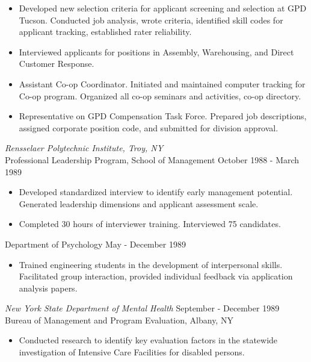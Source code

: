 \documentclass{/Users/alexemrie/Documents/LaTeX/res/res}
\begin{document}
\begin{resume}
   \begin{itemize} \itemsep -2pt %
   \item Developed  new selection criteria for applicant screening and 
    selection  at  GPD  Tucson.  Conducted  job  analysis,  wrote 
    criteria,  identified  skill  codes  for  applicant tracking, 
    established rater reliability. 
   \item Interviewed   applicants   for   positions    in    Assembly, 
    Warehousing, and Direct Customer Response. 
  \item Assistant   Co-op   Coordinator.   Initiated  and  maintained 
    computer tracking for  Co-op  program.  Organized  all  co-op 
    seminars and activities, co-op directory. 
   \item Representative  on  GPD Compensation Task Force. Prepared job 
    descriptions, assigned corporate position code, and submitted 
    for division approval. 
 \end{itemize}
{\sl Rensselaer Polytechnic Institute, Troy, NY} \\[2pt]
Professional Leadership Program, School of Management \hfill    October 
 1988 - March 1989 

 \begin{itemize} \itemsep -2pt
  \item  Developed standardized interview to identify early management 
    potential.  Generated  leadership  dimensions  and  applicant 
    assessment scale. 
  \item  Completed 30 hours of interviewer  training.  Interviewed  75 
 candidates. 
\end{itemize} \vspace{-6pt}
 
Department of Psychology       \hfill               May - December 1989 
 \begin{itemize} 
 \item  Trained  engineering   students   in   the   development   of 
    interpersonal skills. Facilitated group interaction, provided 
    individual feedback via application analysis papers. 
 \end{itemize}
 
{\sl New York State Department of Mental Health} \hfill  September - December 
1989 \\
Bureau of Management and Program Evaluation, Albany, NY 
  \begin{itemize}
  \item  Conducted  research to identify key evaluation factors in the 
    statewide investigation  of  Intensive  Care  Facilities  for 
    disabled persons. 
 \end{itemize}


\end{resume}
\end{document}
